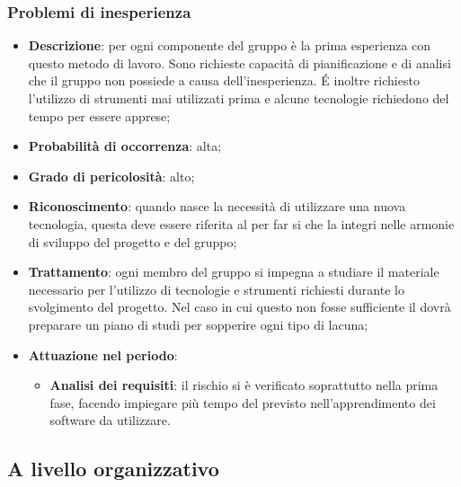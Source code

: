 		\subsubsection{Problemi di inesperienza}
		\begin{itemize}
			\item \textbf{Descrizione}: per ogni componente del gruppo è la prima esperienza con questo metodo di lavoro. Sono richieste capacità di pianificazione e di analisi che il gruppo non possiede a causa dell'inesperienza. \'E inoltre richiesto l'utilizzo di strumenti mai utilizzati prima e alcune tecnologie richiedono del tempo per essere apprese;
			\item \textbf{Probabilità di occorrenza}: alta;
			\item \textbf{Grado di pericolosità}: alto;
			\item \textbf{Riconoscimento}: quando nasce la necessità di utilizzare una nuova tecnologia, questa deve essere riferita al \textit{\Res} per far si che la integri nelle armonie di sviluppo del progetto e del gruppo; 
			\item \textbf{Trattamento}: ogni  membro del gruppo si impegna a studiare il materiale necessario per l'utilizzo di tecnologie e strumenti richiesti durante lo svolgimento del progetto. Nel caso in cui questo non fosse sufficiente il \textit{\Res} dovrà preparare un piano di studi per sopperire ogni tipo di lacuna;	
			\item \textbf{Attuazione nel periodo}:
			\begin{itemize}
				\item \textbf{Analisi dei requisiti}: il rischio si è verificato soprattutto nella prima fase, facendo impiegare più tempo del previsto nell'apprendimento dei software da utilizzare. 
			\end{itemize}
		\end{itemize}
	
	\subsection{A livello organizzativo}
		
